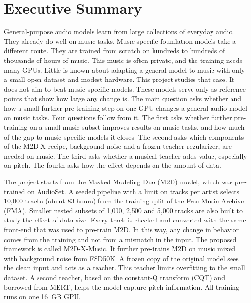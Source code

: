 \documentclass{FastFyp}
\begin{document}
\section*{Executive Summary}
General-purpose audio models learn from large collections of everyday audio. They already do well on music tasks. Music-specific foundation models take a different route. They are trained from scratch on hundreds to hundreds of thousands of hours of music. This music is often private, and the training needs many GPUs. Little is known about adapting a general model to music with only a small open dataset and modest hardware. This project studies that case. It does not aim to beat music-specific models. These models serve only as reference points that show how large any change is. The main question asks whether and how a small further pre-training step on one GPU changes a general-audio model on music tasks. Four questions follow from it. The first asks whether further pre-training on a small music subset improves results on music tasks, and how much of the gap to music-specific models it closes. The second asks which components of the M2D-X recipe, background noise and a frozen-teacher regularizer, are needed on music. The third asks whether a musical teacher adds value, especially on pitch. The fourth asks how the effect depends on the amount of data.

The project starts from the Masked Modeling Duo (M2D) model, which was pre-trained on AudioSet. A seeded pipeline with a limit on tracks per artist selects 10,000 tracks (about 83 hours) from the training split of the Free Music Archive (FMA). Smaller nested subsets of 1,000, 2,500 and 5,000 tracks are also built to study the effect of data size. Every track is checked and converted with the same front-end that was used to pre-train M2D. In this way, any change in behavior comes from the training and not from a mismatch in the input. The proposed framework is called M2D-X-Music. It further pre-trains M2D on music mixed with background noise from FSD50K. A frozen copy of the original model sees the clean input and acts as a teacher. This teacher limits overfitting to the small dataset. A second teacher, based on the constant-Q transform (CQT) and borrowed from MERT, helps the model capture pitch information. All training runs on one 16~GB GPU.
\end{document}
